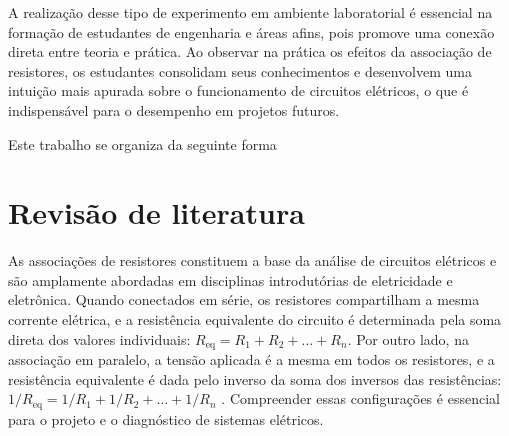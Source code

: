 \documentclass[conference]{IEEEtran}
\begin{document}
A realização desse tipo de experimento em ambiente laboratorial é essencial na formação de estudantes de engenharia e áreas afins, pois promove uma conexão direta entre teoria e prática. Ao observar na prática os efeitos da associação de resistores, os estudantes consolidam seus conhecimentos e desenvolvem uma intuição mais apurada sobre o funcionamento de circuitos elétricos, o que é indispensável para o desempenho em projetos futuros.

Este trabalho se organiza da seguinte forma %

\section{Revisão de literatura}




As associações de resistores constituem a base da análise de circuitos elétricos e são amplamente abordadas em disciplinas introdutórias de eletricidade e eletrônica. Quando conectados em série, os resistores compartilham a mesma corrente elétrica, e a resistência equivalente do circuito é determinada pela soma direta dos valores individuais: $R_\text{eq} = R_1 + R_2 + \dots + R_n$. Por outro lado, na associação em paralelo, a tensão aplicada é a mesma em todos os resistores, e a resistência equivalente é dada pelo inverso da soma dos inversos das resistências: $1/R_\text{eq} = 1/R_1 + 1/R_2 + \dots + 1/R_n$ \cite{hayt2019analise}. Compreender essas configurações é essencial para o projeto e o diagnóstico de sistemas elétricos.
\end{document}
